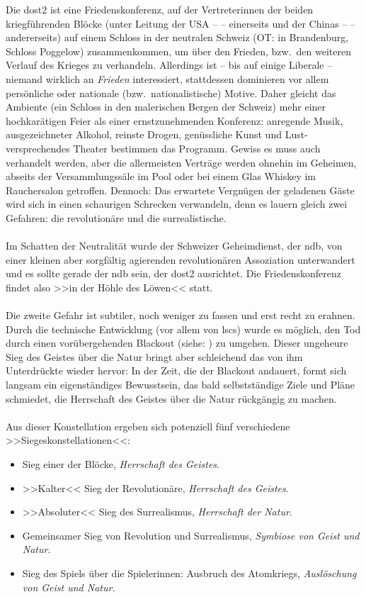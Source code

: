 Die \ac{dost2} ist eine Friedenskonferenz, auf der Vertreterinnen der beiden
kriegführenden Blöcke (unter Leitung der USA --  --
einerseits und der Chinas --  -- andererseits) auf
einem Schloss in der neutralen Schweiz (OT: in Brandenburg, Schloss Poggelow)
zusammenkommen, um über den Frieden, bzw.~den weiteren Verlauf des Krieges zu
verhandeln.
Allerdings ist -- bis auf einige Liberale -- niemand wirklich an \emph{Frieden}
interessiert, stattdessen dominieren vor allem persönliche oder nationale
(bzw.~nationalistische) Motive. Daher gleicht das Ambiente (ein Schloss in den
malerischen Bergen der Schweiz) mehr einer hochkarätigen Feier als einer
ernstzunehmenden Konferenz: anregende Musik, ausgezeichneter Alkohol, reinste
Drogen, genüssliche Kunst und Lust-versprechendes Theater bestimmen das
Programm. Gewiss es muss auch verhandelt werden, aber die allermeisten Verträge
werden ohnehin im Geheimen, abseits der Versammlungssäle im Pool oder bei einem
Glas Whiskey im Rauchersalon getroffen. Dennoch: Das erwartete Vergnügen der
geladenen Gäste wird sich in einen schaurigen Schrecken verwandeln, denn es
lauern gleich zwei Gefahren: die revolutionäre und die surrealistische.\\\\
%
Im Schatten der Neutralität wurde der Schweizer Geheimdienst, der \ac{ndb}, von
einer kleinen aber sorgfältig agierenden revolutionären Assoziation
unterwandert und es sollte gerade der \ac{ndb} sein, der \ac{dost2} ausrichtet.
Die Friedenskonferenz findet also >>in der Höhle des Löwen<< statt.\\\\
%
Die zweite Gefahr ist subtiler, noch weniger zu fassen und erst recht zu
erahnen. Durch die technische Entwicklung (vor allem von \ac{lsc}s) wurde es
möglich, den Tod durch einen vorübergehenden Blackout (siehe:
) zu umgehen.
Dieser ungeheure Sieg des Geistes über die Natur bringt aber schleichend das von
ihm Unterdrückte wieder hervor: 
In der Zeit, die der Blackout andauert, formt sich langsam ein eigenständiges
Bewusstsein, das bald selbstständige Ziele und Pläne schmiedet, die Herrschaft
des Geistes über die Natur rückgängig zu machen.\\\\
%
Aus dieser Konstellation ergeben sich potenziell fünf verschiedene
>>Siegeskonstellationen<<: 
\begin{itemize} 
  \item[] Sieg einer der Blöcke, \emph{Herrschaft des Geistes}.
  \item[] >>Kalter<< Sieg der Revolutionäre, \emph{Herrschaft des Geistes}.
  \item[] >>Absoluter<< Sieg des Surrealismus, \emph{Herrschaft der Natur}.
  \item[] Gemeinsamer Sieg von Revolution und Surrealismus, \emph{Symbiose von
    Geist und Natur}.
  \item[] Sieg des Spiels über die Spielerinnen: Ausbruch des Atomkriegs,
    \emph{Auslöschung von Geist und Natur}.
\end{itemize}
